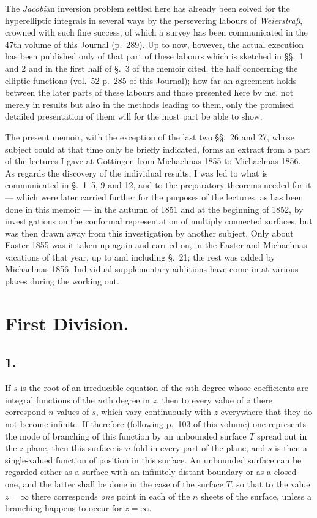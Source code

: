 \documentclass{article}
\begin{document}
The \emph{Jacobi}an inversion problem settled here has already been solved for the hyperelliptic integrals in several ways by the persevering labours of \emph{Weierstraß}, crowned with such fine success, of which a survey has been communicated in the 47th volume of this Journal (p.~289). Up to now, however, the actual execution has been published only of that part of these labours which is sketched in §§.~1 and 2 and in the first half of §.~3 of the memoir cited, the half concerning the elliptic functions (vol.~52 p.~285 of this Journal); how far an agreement holds between the later parts of these labours and those presented here by me, not merely in results but also in the methods leading to them, only the promised detailed presentation of them will for the most part be able to show.

The present memoir, with the exception of the last two §§.~26 and 27, whose subject could at that time only be briefly indicated, forms an extract from a part of the lectures I gave at Göttingen from Michaelmas 1855 to Michaelmas 1856. As regards the discovery of the individual results, I was led to what is communicated in §.~1–5, 9 and 12, and to the preparatory theorems needed for it --- which were later carried further for the purposes of the lectures, as has been done in this memoir --- in the autumn of 1851 and at the beginning of 1852, by investigations on the conformal representation of multiply connected surfaces, but was then drawn away from this investigation by another subject. Only about Easter 1855 was it taken up again and carried on, in the Easter and Michaelmas vacations of that year, up to and including §.~21; the rest was added by Michaelmas 1856. Individual supplementary additions have come in at various places during the working out.

\section*{First Division.}

\subsection*{1.}

If $s$ is the root of an irreducible equation of the $n$th degree whose coefficients are integral functions of the $m$th degree in $z$, then to every value of $z$ there correspond $n$ values of $s$, which vary continuously with $z$ everywhere that they do not become infinite. If therefore (following p.~103 of this volume) one represents the mode of branching of this function by an unbounded surface $T$ spread out in the $z$-plane, then this surface is $n$-fold in every part of the plane, and $s$ is then a single-valued function of position in this surface. An unbounded surface can be regarded either as a surface with an infinitely distant boundary or as a closed one, and the latter shall be done in the case of the surface $T$, so that to the value $z = \infty$ there corresponds \emph{one} point in each of the $n$ sheets of the surface, unless a branching happens to occur for $z = \infty$.
\end{document}

